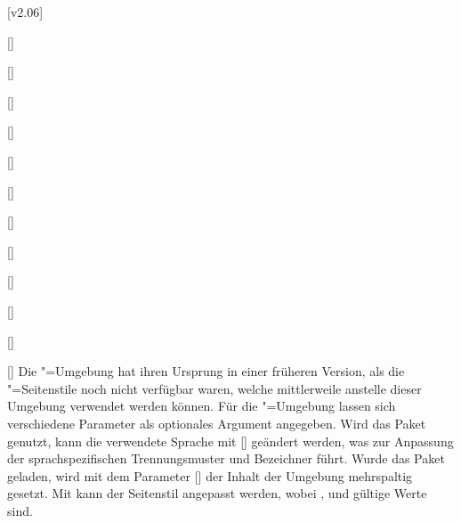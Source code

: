 [v2.06]

\begin{Declaration}{[]}
\begin{Declaration}{[]}
\begin{Declaration}{[]}
\begin{Declaration}[v2.02]{[\PSet]}
\begin{Declaration}{[\PSet]}{%
}
\begin{Declaration}[v2.03]{[\PSet]}{%
}
\begin{Declaration}[v2.03]{[\PSet]}{%
}
\begin{Declaration}{[]}{%
}
\begin{Declaration}[v2.03]{%
  []
}{}
\begin{Declaration}[v2.02]{[\PSet]}{%
}
\begin{Declaration}[v2.02]{[\PSet]}{%
}
\begin{Declaration}[v2.02]{[\PSet]}{%
}
\printdeclarationlist%
%
%
%
%
Die "=Umgebung hat ihren Ursprung in einer früheren 
Version, als die "=Seitenstile noch nicht verfügbar 
waren, welche mittlerweile anstelle dieser Umgebung verwendet werden können.
Für die "=Umgebung lassen sich verschiedene Parameter als 
optionales Argument angegeben. Wird das Paket  genutzt, kann die 
verwendete Sprache mit [] 
geändert werden, was zur Anpassung der sprachspezifischen Trennungsmuster und 
Bezeichner führt. Wurde das Paket  geladen, wird mit dem 
Parameter [] der Inhalt der 
Umgebung mehrspaltig gesetzt. Mit  kann 
der Seitenstil angepasst werden, wobei ,  und 
 gültige Werte sind. 


\end{Declaration}
\end{Declaration}
\end{Declaration}
\end{Declaration}
\end{Declaration}
\end{Declaration}
\end{Declaration}
\end{Declaration}
\end{Declaration}
\end{Declaration}
\end{Declaration}
\end{Declaration}
